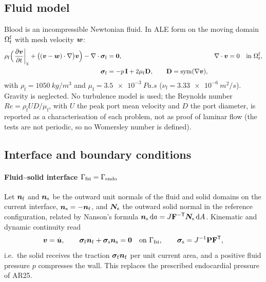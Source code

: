 \subsection{Fluid model}\label{sec:fluid}
Blood is an incompressible Newtonian fluid. In ALE form on the moving domain
$\Omega^{\mathrm{f}}_t$ with mesh velocity $\bm{w}$:
\begin{align}
\rho_{\mathrm{f}}\Bigl(\left.\frac{\partial\bm{v}}{\partial t}\right|_{\chi}
 + \bigl((\bm{v}-\bm{w})\cdot\nabla\bigr)\bm{v}\Bigr)
 - \nabla\cdot\bm{\sigma}_{\mathrm{f}} &= \bm{0}, &
\nabla\cdot\bm{v} &= 0 \quad\text{in } \Omega^{\mathrm{f}}_t,\\
\bm{\sigma}_{\mathrm{f}} &= -p\,\mathbf{I} + 2\mu_{\mathrm{f}}\mathbf{D},\qquad
\mathbf{D} = \operatorname{sym}(\nabla\bm{v}),
\end{align}
with $\rho_{\mathrm f}=\SI{1050}{kg/m^3}$ and
$\mu_{\mathrm f}=\SI{3.5e-3}{Pa.s}$ ($\nu_{\mathrm f} = \SI{3.33e-6}{m^2/s}$).
Gravity is neglected. No turbulence model is used; the Reynolds number
$Re=\rho_{\mathrm f}U D/\mu_{\mathrm f}$, with $U$ the peak port mean velocity
and $D$ the port diameter, is reported as a characterisation of each
problem, not as proof of laminar flow (the tests are not periodic, so no
Womersley number is defined).

\subsection{Interface and boundary conditions}\label{sec:bcs}

\paragraph{Fluid--solid interface $\Gamma_{\mathrm{fsi}}=\Gamma_{\mathrm{endo}}$} Let $\bm{n}_{\mathrm f}$ and
$\bm{n}_{\mathrm s}$ be the outward unit normals of the fluid and solid domains
on the current interface, $\bm{n}_{\mathrm s}=-\bm{n}_{\mathrm f}$, and $\bm{N}_{\mathrm s}$
the outward solid normal in the reference configuration, related by Nanson's
formula $\bm{n}_{\mathrm s}\,\mathrm da = J\mathbf{F}^{-\mathsf T}\bm{N}_{\mathrm s}\,\mathrm dA$.
Kinematic and dynamic continuity read
\begin{equation}
\bm{v} = \dot{\bm{u}},\qquad
\bm{\sigma}_{\mathrm f}\bm{n}_{\mathrm f} + \bm{\sigma}_{\mathrm s}\bm{n}_{\mathrm s} = \bm{0}
\quad\text{on }\Gamma_{\mathrm{fsi}},\qquad \bm{\sigma}_{\mathrm s} = J^{-1}\mathbf{P}\mathbf{F}^{\mathsf T},
\label{eq:interface}
\end{equation}
i.e.\ the solid receives the traction $\bm{\sigma}_{\mathrm f}\bm{n}_{\mathrm f}$ per
unit current area, and a positive fluid pressure $p$ compresses the wall.
This replaces the prescribed endocardial pressure of AR25.

